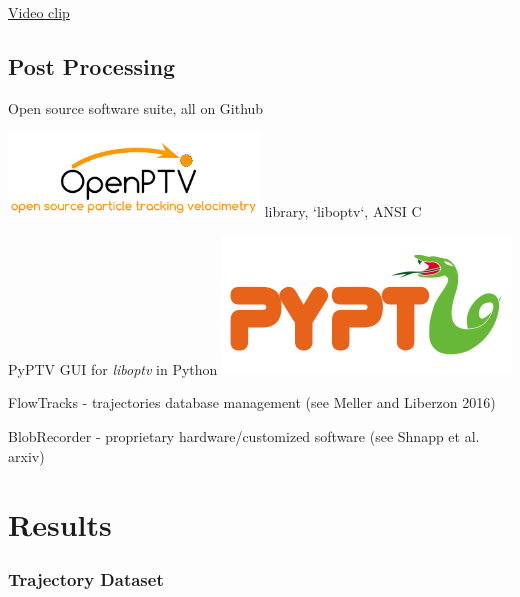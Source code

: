 \documentclass[aspectratio=43]{beamer}
\begin{document}

\begin{frame}{\href{./fig/flow_inside_laser.mp4}{Video clip}}
\centering{}
\end{frame}



	 
\subsection{Post Processing}

\begin{frame}{Open source software suite, all on Github}
\itemize
\item \includegraphics[width=0.5\textwidth]{openptv_logo} \hspace{1em} library, `liboptv`, ANSI C
\item PyPTV GUI for {\em liboptv} in Python \includegraphics[width=.3\textwidth]{pyptv}
\item FlowTracks - trajectories database management (see Meller and Liberzon 2016)
\item BlobRecorder - proprietary hardware/customized software (see Shnapp et al. arxiv)
\end{frame}



\section{Results}\label{sec:results}
\subsubsection*{Trajectory Dataset}
%
\begin{frame}
	\centering
\end{frame}
\end{document}
